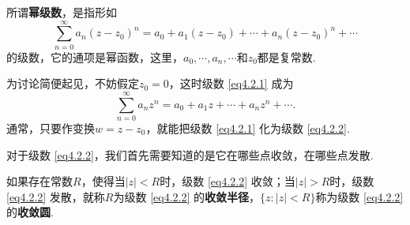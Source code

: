 所谓\textbf{幂级数}，是指形如
\begin{equation}\label{eq4.2.1}
\sum_{n=0}^\infty a_n(z-z_0)^n=a_0+a_1(z-z_0)+\cdots+a_n(z-z_0)^n+\cdots
\end{equation}
的级数，它的通项是幂函数，这里，$a_0,\cdots,a_n,\cdots$和$z_0$都是复常数.

为讨论简便起见，不妨假定$z_0=0$，这时级数 \eqref{eq4.2.1} 成为
\begin{equation}\label{eq4.2.2}
\sum_{n=0}^\infty a_nz^n=a_0+a_1z+\cdots+a_nz^n+\cdots.
\end{equation}
通常，只要作变换$w=z-z_0$，就能把级数 \eqref{eq4.2.1} 化为级数 \eqref{eq4.2.2}.

对于级数 \eqref{eq4.2.2}，我们首先需要知道的是它在哪些点收敛，在哪些点发散.
\begin{definition}\label{def4.2.1}
如果存在常数$R$，使得当$|z|<R$时，级数 \eqref{eq4.2.2} 收敛；当$|z|>R$时，级数 \eqref{eq4.2.2} 发散，就称$R$为级数 \eqref{eq4.2.2} 的\textbf{收敛半径}，$\{z:|z|<R\}$称为级数 \eqref{eq4.2.2} 的\textbf{收敛圆}.
\end{definition}

